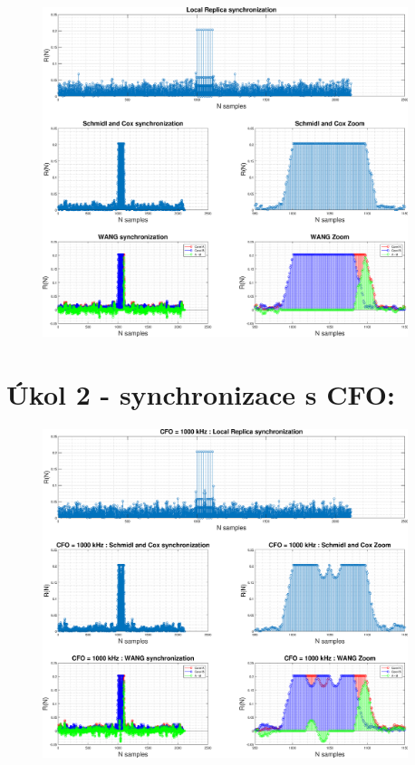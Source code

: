 \documentclass[10pt, a4paper]{article}%
\begin{document}
        \begin{figure}[ht!]
            \centering
            \includegraphics[width = 0.95\textwidth]{cviceni/sync.eps}
        \end{figure}

	\clearpage
	\section*{\Large Úkol 2 - synchronizace s CFO:}

    \begin{figure}[ht!]
        \centering
        \includegraphics[width = 0.95\textwidth]{cviceni/sync_CFO.eps}
    \end{figure}
\end{document}
